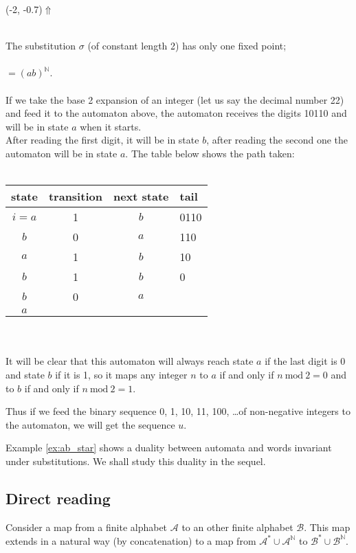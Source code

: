 \documentclass{article}
\begin{document}
\begin{example}
\begin{graph}
  \freetext(-2, -0.7){$\Uparrow$}
\end{graph}\\
The substitution $\sigma$ (of constant length 2) has only one fixed point;\\
\\
$= (ab)^\mathbb{N}$.\\
\\
If we take the base 2 expansion of an integer (let us say the decimal
number 22) and feed it to the automaton above, the automaton receives the
digits 10110 and will be in state $a$ when it starts.\\
After reading the first digit, it will be in state $b$, after reading the
second one the automaton will be in state $a$. The table below shows the path
taken:\\
\\
\begin{tabular}{c|c|c|l}
state & transition & next state & tail\\
\hline
$i=a$ & 1 & $b$ & 0110\\
$b$   & 0 & $a$ & 110\\
$a$   & 1 & $b$ & 10\\
$b$   & 1 & $b$ & 0\\
$b$   & 0 & $a$ &\\
$a$   &   &   &
\end{tabular}\\
\\
It will be clear that this automaton will always reach state $a$ if the last 
digit is 0 and state $b$ if it is 1, so it maps any integer $n$ to $a$ if and 
only if $n \mathrm{\ mod\ } 2 = 0$ and to $b$ if and only if 
$n \mathrm{\ mod\ } 2 = 1$.

Thus if we feed the binary sequence 0, 1, 10, 11, 100, \ldots of non-negative 
integers to the automaton, we will get the sequence $u$.
\end{example}

Example \ref{ex:ab_star} shows a duality between automata and words invariant 
under substitutions. We shall study this duality in the sequel.

\subsection{Direct reading}
\begin{definition} \label{def:letter-to-letter}
Consider a map from a finite alphabet $\mathcal{A}$ to an other finite alphabet
$\mathcal{B}$. This map extends in a natural way (by concatenation) to a map 
from $\mathcal{A}^* \cup \mathcal{A}^\mathbb{N}$ to
$\mathcal{B}^* \cup \mathcal{B}^\mathbb{N}$.
\end{definition}
\end{document}

